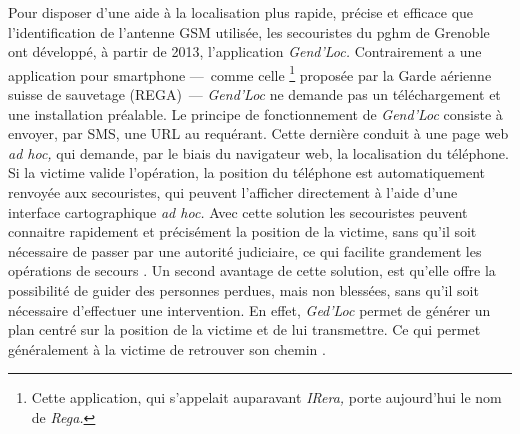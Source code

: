 Pour disposer d'une aide à la localisation plus rapide, précise et
efficace que l'identification de l'antenne GSM utilisée, les
secouristes du \ac{pghm} de Grenoble ont développé, à partir de 2013,
l’application \emph{Gend'Loc.} Contrairement a une application pour
smartphone ---~comme celle \footnote{Cette application, qui s’appelait
  auparavant \emph{IRera,} porte aujourd'hui le nom de \emph{Rega.}}
proposée par la Garde aérienne suisse de sauvetage (REGA)~---
\emph{Gend'Loc} ne demande pas un téléchargement et une installation
préalable. Le principe de fonctionnement de \emph{Gend'Loc} consiste à
envoyer, par SMS, une URL au requérant. Cette dernière conduit à une
page web \emph{ad hoc,} qui demande, par le biais du navigateur web,
la localisation du téléphone. Si la victime valide l'opération, la
position du téléphone est automatiquement renvoyée aux secouristes,
qui peuvent l'afficher directement à l'aide d'une interface
cartographique \emph{ad hoc.}  Avec cette solution les secouristes
peuvent connaitre rapidement et précisément la position de la victime,
sans qu'il soit nécessaire de passer par une autorité judiciaire, ce
qui facilite grandement les opérations de secours
\autocite{Muscat2015}. Un second avantage de cette solution, est
qu'elle offre la possibilité de guider des personnes perdues, mais non
blessées, sans qu'il soit nécessaire d'effectuer une intervention. En
effet, \emph{Ged'Loc} permet de générer un plan centré sur la position
de la victime et de lui transmettre. Ce qui permet généralement à la
victime de retrouver son chemin \autocite{Muscat2015}.

